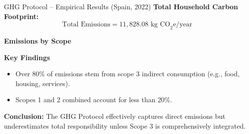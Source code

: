 \documentclass{beamer}
\begin{document}
\begin{frame}{GHG Protocol – Empirical Results (Spain, 2022)}
\vspace{-2.0em}
\footnotesize
\textbf{Total Household Carbon Footprint:}  
\[
\text{Total Emissions} = 11,828.08 \text{ kg CO}_2\text{e/year}
\]

\vspace{0.5em}
\textbf{Emissions by Scope}
\begin{table}[h!]
\small
\centering
\end{table}

\footnotesize
\textbf{Key Findings}
\begin{itemize}
  \item Over 80\% of emissions stem from scope 3 indirect consumption (e.g., food, housing, services).
  \item Scopes 1 and 2 combined account for less than 20\%.
\end{itemize}

\vspace{0.5em}
\textbf{Conclusion:}  
The GHG Protocol effectively captures direct emissions but underestimates total responsibility unless Scope 3 is comprehensively integrated.

\end{frame}
\end{document}
